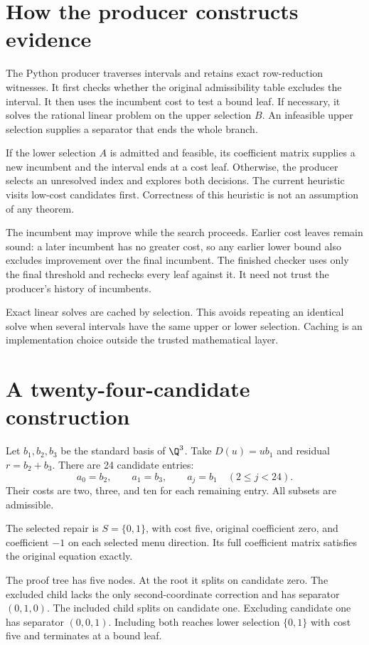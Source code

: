 \section{How the producer constructs evidence}

The Python producer traverses intervals and retains exact row-reduction witnesses. It first checks whether the original admissibility table excludes the interval. It then uses the incumbent cost to test a bound leaf. If necessary, it solves the rational linear problem on the upper selection $B$. An infeasible upper selection supplies a separator that ends the whole branch.

If the lower selection $A$ is admitted and feasible, its coefficient matrix supplies a new incumbent and the interval ends at a cost leaf. Otherwise, the producer selects an unresolved index and explores both decisions. The current heuristic visits low-cost candidates first. Correctness of this heuristic is not an assumption of any theorem.

The incumbent may improve while the search proceeds. Earlier cost leaves remain sound: a later incumbent has no greater cost, so any earlier lower bound also excludes improvement over the final incumbent. The finished checker uses only the final threshold and rechecks every leaf against it. It need not trust the producer's history of incumbents.

Exact linear solves are cached by selection. This avoids repeating an identical solve when several intervals have the same upper or lower selection. Caching is an implementation choice outside the trusted mathematical layer.

\section{A twenty-four-candidate construction}

Let $b_1,b_2,b_3$ be the standard basis of $\Q^3$. Take $D(u)=ub_1$ and residual $r=b_2+b_3$. There are 24 candidate entries:
\[
 a_0=b_2,\qquad a_1=b_3,\qquad a_j=b_1\quad(2\leq j<24).
\]
Their costs are two, three, and ten for each remaining entry. All subsets are admissible.

The selected repair is $S=\{0,1\}$, with cost five, original coefficient zero, and coefficient $-1$ on each selected menu direction. Its full coefficient matrix satisfies the original equation exactly.

The proof tree has five nodes. At the root it splits on candidate zero. The excluded child lacks the only second-coordinate correction and has separator $(0,1,0)$. The included child splits on candidate one. Excluding candidate one has separator $(0,0,1)$. Including both reaches lower selection $\{0,1\}$ with cost five and terminates at a bound leaf.

